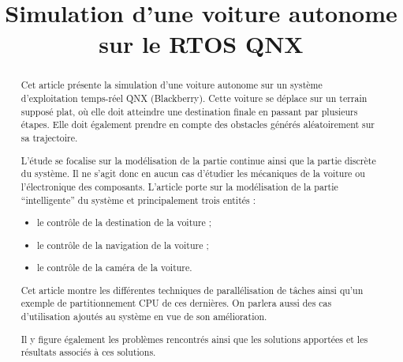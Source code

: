 \documentclass[conference]{IEEEtran}
\begin{document}
\title{Simulation d'une voiture autonome sur le RTOS QNX}

\author{
\and
{}
}

\maketitle

\begin{abstract}

Cet article présente la simulation d'une voiture
autonome sur un système d'exploitation temps-réel
 QNX (Blackberry). Cette voiture se déplace sur un terrain
 supposé plat, où elle doit atteindre une destination 
 finale en passant par plusieurs étapes. Elle doit également
 prendre en compte des obstacles générés aléatoirement sur sa
 trajectoire.
 
 L'étude se focalise sur la modélisation de la partie continue ainsi que la partie
 discrète du système. Il ne s'agit donc en aucun cas d'étudier les mécaniques de la
 voiture ou l'électronique des composants. L'article porte sur la modélisation de la
 partie \enquote{intelligente} du système et principalement trois entités :
 \begin{itemize}
     \item le contrôle de la destination de la voiture ;
     \item le contrôle de la navigation de la voiture ;
     \item le contrôle de la caméra de la voiture.
 \end{itemize}
 
 Cet article montre les différentes techniques de parallélisation
 de tâches ainsi qu'un exemple de partitionnement CPU de ces dernières. On parlera aussi des cas d'utilisation ajoutés au système en vue de son amélioration.
 
 Il y figure également les problèmes rencontrés ainsi que les solutions apportées et les résultats associés à ces solutions.
 
\end{abstract}
\end{document}
